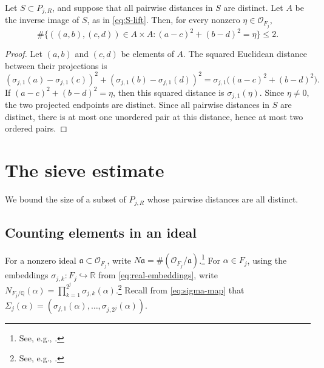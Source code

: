 \begin{proposition}\label{prop:distance-sidon-lift}
Let \(S\subset P_{j,R}\), and suppose that all pairwise distances in \(S\) are distinct.
Let \(A\) be the inverse image of \(S\), as in \eqref{eq:S-lift}.
Then, for every nonzero \(\eta\in\mathcal O_{F_j}\),
\begin{equation}\label{eq:sidon-bound}
\#\{((a,b),(c,d))\in A\times A:
(a-c)^2+(b-d)^2=\eta\}
\le2.
\end{equation}
\end{proposition}

\begin{proof}
Let \((a,b)\) and \((c,d)\) be elements of \(A\).
The squared Euclidean distance between their projections is
\begin{equation}\label{eq:distance-lift}
(\sigma_{j,1}(a)-\sigma_{j,1}(c))^2
+(\sigma_{j,1}(b)-\sigma_{j,1}(d))^2
=
\sigma_{j,1}\bigl((a-c)^2+(b-d)^2\bigr).
\end{equation}
If \((a-c)^2+(b-d)^2=\eta\), then this squared distance is \(\sigma_{j,1}(\eta)\).
Since \(\eta\ne0\), the two projected endpoints are distinct.
Since all pairwise distances in \(S\) are distinct, there is at most one unordered pair at this distance, hence at most two ordered pairs.
\end{proof}

\section{The sieve estimate}
\label{sec:sieve-estimate}

We bound the size of a subset of \(P_{j,R}\) whose pairwise distances are all distinct.

\subsection{Counting elements in an ideal}
\label{subsec:counting-elements-in-an-ideal}

For a nonzero ideal \(\mathfrak a\subset\mathcal O_{F_j}\), write \(N\mathfrak a=\#(\mathcal O_{F_j}/\mathfrak a)\).\footnote{See, e.g., \cite[Section~4, ``Norms of ideals,'' before Proposition~4.2]{Mil20}.}
For \(\alpha\in F_j\), using the embeddings \(\sigma_{j,k}:F_j\hookrightarrow\mathbb R\) from \eqref{eq:real-embeddings}, write \(N_{F_j/\mathbb Q}(\alpha)=\prod_{k=1}^{2^j}\sigma_{j,k}(\alpha)\).\footnote{See, e.g., \cite[Section~2, ``Review of norms and traces,'' especially Corollary~2.20]{Mil20}.}
Recall from \eqref{eq:sigma-map} that \(\Sigma_j(\alpha)=(\sigma_{j,1}(\alpha),\ldots,\sigma_{j,2^j}(\alpha))\).

